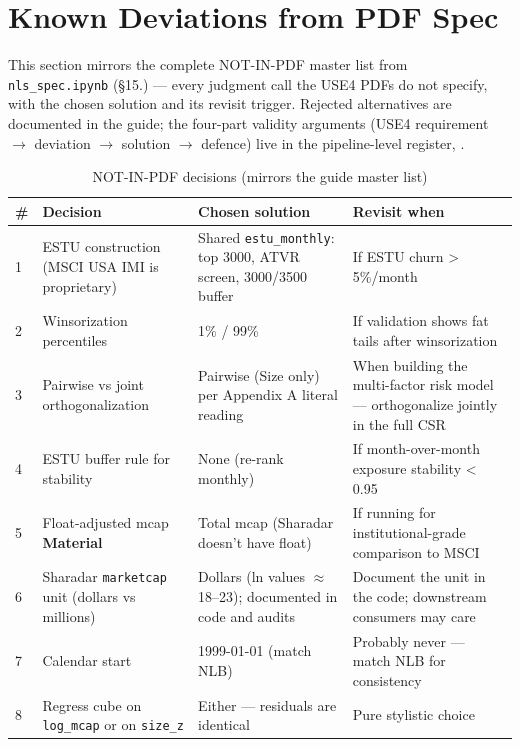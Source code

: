 \documentclass[11pt,a4paper]{article}
\newcommand{\WARN}[1]{\textcolor{warn}{\textbf{#1}}}
\begin{document}
\section{Known Deviations from PDF Spec}

This section mirrors the complete NOT-IN-PDF master list from
\texttt{nls\_spec.ipynb} (\S15.) --- every judgment call the USE4 PDFs do not
specify, with the chosen solution and its revisit trigger. Rejected alternatives
are documented in the guide; the four-part validity arguments (USE4 requirement
$\to$ deviation $\to$ solution $\to$ defence) live in the pipeline-level
register, .

\begin{longtable}{@{}p{0.5cm}p{3.6cm}p{6.0cm}p{3.8cm}@{}}
\caption{NOT-IN-PDF decisions (mirrors the guide master list)}\\
\toprule
\textbf{\#} & \textbf{Decision} & \textbf{Chosen solution} & \textbf{Revisit when} \\
\midrule
\endhead
1 & ESTU construction (MSCI USA IMI is proprietary) & Shared \texttt{estu\_monthly}: top 3000, ATVR screen, 3000/3500 buffer & If ESTU churn > 5\%/month \\[3pt]
2 & Winsorization percentiles & 1\% / 99\% & If validation shows fat tails after winsorization \\[3pt]
3 & Pairwise vs joint orthogonalization & Pairwise (Size only) per Appendix A literal reading & When building the multi-factor risk model --- orthogonalize jointly in the full CSR \\[3pt]
4 & ESTU buffer rule for stability & None (re-rank monthly) & If month-over-month exposure stability < 0.95 \\[3pt]
5 & Float-adjusted mcap \WARN{Material} & Total mcap (Sharadar doesn't have float) & If running for institutional-grade comparison to MSCI \\[3pt]
6 & Sharadar \texttt{marketcap} unit (dollars vs millions) & Dollars (ln values $\approx$ 18--23); documented in code and audits & Document the unit in the code; downstream consumers may care \\[3pt]
7 & Calendar start & 1999-01-01 (match NLB) & Probably never --- match NLB for consistency \\[3pt]
8 & Regress cube on \texttt{log\_mcap} or on \texttt{size\_z} & Either --- residuals are identical & Pure stylistic choice \\[3pt]
\bottomrule
\end{longtable}
\end{document}
